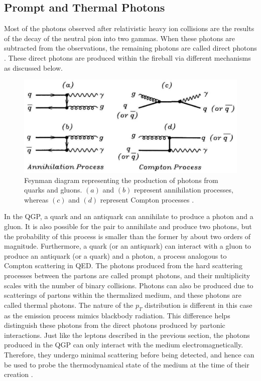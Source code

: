 \subsection{Prompt and Thermal Photons}
Most of the photons observed after relativistic heavy ion collisions are the results of the decay of the neutral pion into two gammas. %
When these photons are subtracted from the observations, the remaining photons are called direct photons \cite{PAQUET2016409}. These direct photons are produced within the fireball via different mechanisms as discussed below.
\begin{figure}[h]
  \centering
  \includegraphics[width=6.5in]{figures/directPhotons.PNG}
  \caption{Feynman diagram representing the production of photons from quarks and gluons. $(a)$ and $(b)$ represent annihilation processes, whereas $(c)$ and $(d)$ represent Compton processes \cite{wong1994introduction}.}\label{fig:directPhotons}
\end{figure}

In the QGP, a quark and an antiquark can annihilate to produce a photon and a gluon. It is also possible for the pair to annihilate and produce two photons, but the probability of this process is smaller than the former by about two orders of magnitude. Furthermore, a quark (or an antiquark) can interact with a gluon to produce an antiquark (or a quark) and a photon, a process analogous to Compton scattering in QED. The photons produced from the hard scattering processes between the partons are called prompt photons, and their multiplicity scales with the number of binary collisions. Photons can also be produced due to scatterings of partons within the thermalized medium, and these photons are called thermal photons. The nature of the $p_{T}$ distribution is different in this case as the emission process mimics blackbody radiation. This difference helps distinguish these photons from the direct photons produced by partonic interactions. Just like the leptons described in the previous section, the photons produced in the QGP can only interact with the medium electromagnetically. Therefore, they undergo minimal scattering before being detected, and hence can be used to probe the thermodynamical state of the medium at the time of their creation \cite{wong1994introduction,PAQUET2016409,Wilde:2012wc}.

